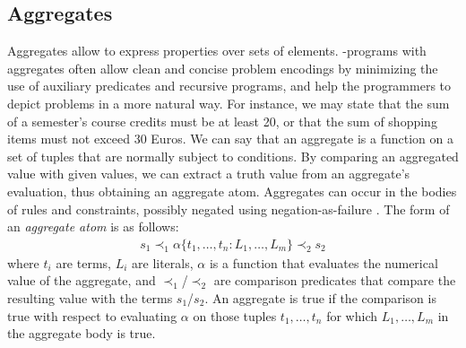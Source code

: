 \documentclass[a4paper, titlepage]{article}
\DeclareMathOperator{\leftimpl}{:-}
\newcommand\mycenterline[1]{\par\smallskip\centerline{#1} \smallskip}
\begin{document}
%

\subsection{Aggregates}
\label{aggregates}
Aggregates allow to express properties over sets of 
elements. \hex{}-programs with aggregates often allow clean 
and concise problem encodings by minimizing the use of 
auxiliary predicates and recursive programs, and help the 
programmers to depict problems in a more natural way. For 
instance, we may state that the sum of a semester's course 
credits must be at least 20, or that the sum of shopping 
items must not exceed 30 Euros. We can say that an 
aggregate is a function on a set of tuples that are 
normally subject to conditions. By comparing an aggregated 
value with given values, we can extract a truth value from 
an aggregate's evaluation, thus obtaining an aggregate 
atom.
Aggregates can occur in the bodies of rules and constraints, 
possibly negated using negation-as-failure \cite{gkklorst2015}.
%
The form of an \emph{aggregate atom} is as follows:
\begin{align*}
s_1 \prec_1 \alpha \{ t_1, \dots, t_n : L_1, \dots, L_m\} \prec_2 s_2
\end{align*}
where $\mathit{t_i}$ are terms,
$\mathit{L_i}$ are literals,
$\alpha$ is a function that evaluates the numerical value of the aggregate,
and $\prec_1$/$\prec_2$ are comparison predicates 
that compare the resulting value with the terms $s_1$/$s_2$. 
%
An aggregate is true if the comparison is true
with respect to evaluating $\alpha$ on those tuples $t_1,\ldots,t_n$
for which $L_1,\ldots,L_m$ in the aggregate body is true.
\end{document}
